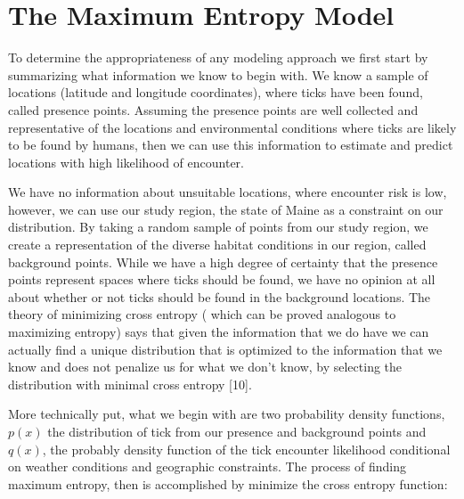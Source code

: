 
\section{The Maximum Entropy Model}

To determine the appropriateness of any modeling approach we first start by summarizing what information we know to begin with. We know a sample of locations (latitude and longitude coordinates), where ticks have been found, called presence points. Assuming the presence points are well collected and representative of the locations and environmental conditions where ticks are likely to be found by humans, then we can use this information to estimate and predict locations with high likelihood of encounter. \newline

\noindent We have no information about unsuitable locations, where encounter risk is low, however, we can use our study region, the state of Maine as a constraint on our distribution. By taking a random sample of points from our study region, we create a representation of the diverse habitat conditions in our region, called background points. While we have a high degree of certainty that the presence points represent spaces where ticks should be found, we have no opinion at all about whether or not ticks should be found in the background locations. The theory of minimizing cross entropy ( which can be proved analogous to maximizing entropy)  says that given the information that we do have we can actually find a unique distribution that is optimized to the information that we know and does not penalize us for what we don't know, by selecting the distribution with minimal cross entropy [10].\newline


\noindent More technically put, what we begin with are two probability density functions, $p(x)$ the distribution of tick from our presence and background points and $q(x)$, the probably density function of the tick encounter likelihood conditional on weather conditions and geographic constraints. The process of finding maximum entropy, then is  accomplished by minimize the cross entropy function:  \newline

